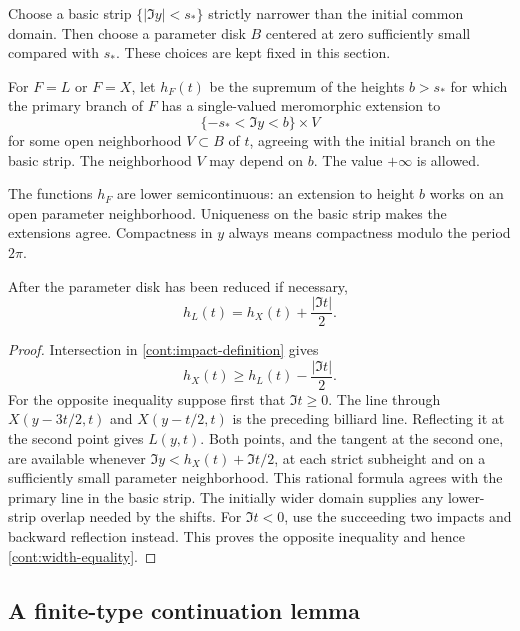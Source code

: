 Choose a basic strip \(\{|\Im y|<s_*\}\) strictly narrower than the
initial common domain.  Then choose a parameter disk \(B\) centered at
zero sufficiently small compared with \(s_*\).  These choices are kept
fixed in this section.

\begin{definition}
\label{cont:width-definition}
For \(F=L\) or \(F=X\), let \(h_F(t)\) be the supremum of the heights
\(b>s_*\) for which the primary branch of \(F\) has a single-valued
meromorphic extension to
\[
 \{-s_*<\Im y<b\}\times V
\]
for some open neighborhood \(V\subset B\) of \(t\), agreeing with the
initial branch on the basic strip.  The neighborhood \(V\) may depend
on \(b\).  The value \(+\infty\) is allowed.
\end{definition}

The functions \(h_F\) are lower semicontinuous: an extension to height
\(b\) works on an open parameter neighborhood.  Uniqueness on the basic
strip makes the extensions agree.  Compactness in \(y\) always means
compactness modulo the period \(2\pi\).

\begin{lemma}
\label{cont:width-relation}
After the parameter disk has been reduced if necessary,
\begin{equation}
 h_L(t)=h_X(t)+\frac{|\Im t|}{2}.
 \label{cont:width-equality}
\end{equation}
\end{lemma}

\begin{proof}
Intersection in \eqref{cont:impact-definition} gives
\[
 h_X(t)\ge h_L(t)-\frac{|\Im t|}{2}.
 \]
For the opposite inequality suppose first that \(\Im t\ge0\).  The
line through \(X(y-3t/2,t)\) and \(X(y-t/2,t)\) is the preceding
billiard line.  Reflecting it at the second point gives \(L(y,t)\).
Both points, and the tangent at the second one, are available whenever
\(\Im y<h_X(t)+\Im t/2\), at each strict subheight and on a
sufficiently small parameter neighborhood.  This rational formula
agrees with the primary line in the basic strip.  The initially wider
domain supplies any lower-strip overlap needed by the shifts.
For \(\Im t<0\), use the succeeding two impacts and backward
reflection instead.  This proves the opposite inequality and hence
\eqref{cont:width-equality}.
\end{proof}

\subsection{A finite-type continuation lemma}

